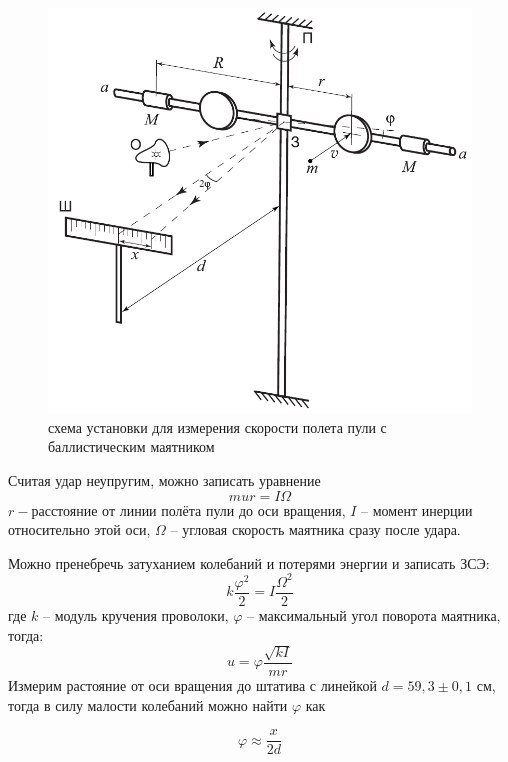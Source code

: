 \begin{center}
	\begin{figure}[h]
		\begin{center}
			\includegraphics[scale = 0.66]{1.2.1 ustan2}
			\caption{схема установки для измерения скорости полета пули с баллистическим маятником}
		\end{center}
	\end{figure}
	
	Считая удар неупругим, можно записать уравнение
	$$mur=I \Omega$$
	$r-$расстояние от линии полёта пули до оси вращения, $I$ -- момент инерции относительно этой оси, $\Omega$ -- угловая скорость маятника сразу после удара.
	
	Можно пренебречь затуханием колебаний и потерями энергии и записать ЗСЭ:
	$$ k \frac{\varphi^2}{2} = I \frac{\Omega^2}{2} $$
	\noindent где $k$ -- модуль кручения проволоки, $\varphi$ -- максимальный угол поворота маятника, тогда:
	\begin{equation} \label{vel2}
		u = \varphi \frac{\sqrt{kI}}{mr} 
	\end{equation}
	Измерим растояние от оси вращения до штатива с линейкой $d = 59,3 \pm 0,1 \text{ см}$, тогда в силу малости колебаний можно найти $\varphi$ как
	
	\begin{equation}
		\label{phi}
		\varphi \approx \frac{x}{2d}
	\end{equation}
	

\end{center}
